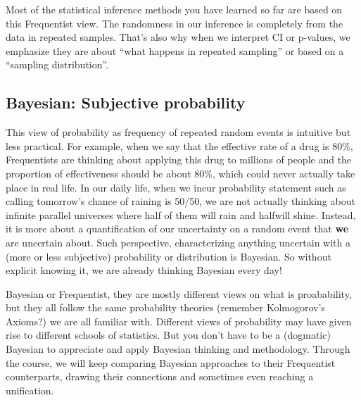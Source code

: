 \documentclass[
]{book}
\begin{document}
Most of the statistical inference methods you have learned so far are based on this Frequentist view. The randomness in our inference is completely from the data in repeated samples. That's also why when we interpret CI or p-values, we emphasize they are about ``what happens in repeated sampling'' or based on a ``sampling distribution''.

\hypertarget{bayesian-subjective-probability}{%
\subsection{Bayesian: Subjective probability}\label{bayesian-subjective-probability}}

This view of probability as frequency of repeated random events is intuitive but less practical. For example, when we say that the effective rate of a drug is 80\%, Frequentists are thinking about applying this drug to millions of people and the proportion of effectiveness should be about 80\%, which could never actually take place in real life. In our daily life, when we incur probability statement such as calling tomorrow's chance of raining is 50/50, we are not actually thinking about infinite parallel universes where half of them will rain and halfwill shine. Instead, it is more about a quantification of our uncertainty on a random event that \textbf{we} are uncertain about. Such perspective, characterizing anything uncertain with a (more or less subjective) probability or distribution is Bayesian. So without explicit knowing it, we are already thinking Bayesian every day!

Bayesian or Frequentist, they are mostly different views on what is proabability, but they all follow the same probability theories (remember Kolmogorov's Axioms?) we are all familiar with. Different views of probability may have given rise to different schools of statistics. But you don't have to be a (dogmatic) Bayesian to appreciate and apply Bayesian thinking and methodology. Through the course, we will keep comparing Bayesian approaches to their Frequentist counterparts, drawing their connections and sometimes even reaching a unification.

  
\end{document}
